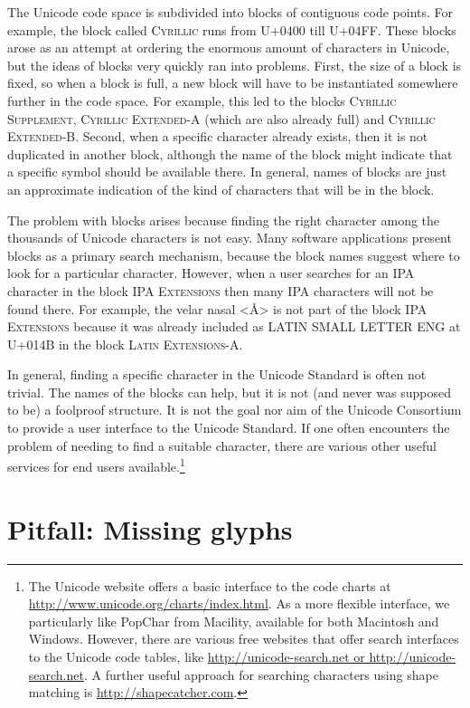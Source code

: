 The Unicode code space is subdivided into blocks of contiguous code points. For example, the block called \textsc{Cyrillic} runs from U+0400 till U+04FF. These blocks arose as an attempt at ordering the enormous amount of characters in Unicode, but the ideas of blocks very quickly ran into problems. First, the size of a block is fixed, so when a block is full, a new block will have to be instantiated somewhere further in the code space. For example, this led to the blocks \textsc{Cyrillic Supplement}, \textsc{Cyrillic Extended-A} (which are also already full) and \textsc{Cyrillic Extended-B}. Second, when a specific character already exists, then it is not duplicated in another block, although the name of the block might indicate that a specific symbol should be available there. In general, names of blocks are just an approximate indication of the kind of characters that will be in the block.

The problem with blocks arises because finding the right character among the thousands of Unicode characters is not easy. Many software applications present blocks as a primary search mechanism, because the block names suggest where to look for a particular character. However, when a user searches for an IPA character in the block \textsc{IPA Extensions} then many IPA characters will not be found there. For example, the velar nasal <Å> is not part of the block \textsc{IPA Extensions} because it was already included as LATIN SMALL LETTER ENG at U+014B in the block \textsc{Latin Extensions-A}.

In general, finding a specific character in the Unicode Standard is often not trivial. The names of the blocks can help, but it is not (and never was supposed to be) a foolproof structure. It is not the goal nor aim of the Unicode Consortium to provide a user interface to the Unicode Standard. If one often encounters the problem of needing to find a suitable character, there are various other useful services for end users available.\footnote{The Unicode website offers a basic interface to the code charts at \url{http://www.unicode.org/charts/index.html}. As a more flexible interface, we particularly like PopChar from Macility, available for both Macintosh and Windows. However, there are various free websites that offer search interfaces to the Unicode code tables, like \url{http://unicode-search.net or http://unicode-search.net}. A further useful approach for searching characters using shape matching is \url{http://shapecatcher.com}.}

\section{Pitfall: Missing glyphs}
\label{pitfall-missing-glyphs}

